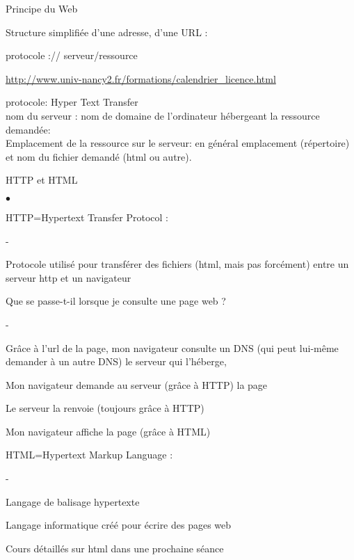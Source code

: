 \documentclass[hyperref=dvips,11pt,svgnames, smaller,  aspectratio=169]{beamer}
\begin{document}
\begin{frame}
	\begin{block}{Principe du Web}

Structure simplifiée d’une adresse, d’une URL :

protocole :// serveur/ressource


\url{http://www.univ-nancy2.fr/formations/calendrier_licence.html}

protocole: Hyper Text Transfer\\
nom du serveur : nom de domaine de l'ordinateur hébergeant la ressource demandée:  \\
Emplacement de la ressource sur le serveur:  en général emplacement (répertoire) et nom du fichier demandé (html ou autre).
	\end{block}
\end{frame}




\begin{frame}
	\begin{block}{HTTP et HTML}

\begin{list}{$\bullet$}{}
\item HTTP=Hypertext Transfer Protocol :
	\begin{list}{-}{}
	\item Protocole utilisé pour transférer des fichiers (html, mais pas forcément) entre un serveur http et un navigateur
	\end{list}
\item Que se passe-t-il lorsque je consulte une page web ?
	\begin{list}{-}{}
	\item Grâce à l’url de la page, mon navigateur consulte un DNS (qui peut lui-même demander à un autre DNS) le serveur qui l’héberge,
	\item Mon navigateur demande au serveur (grâce à HTTP) la page 
	\item Le serveur la renvoie (toujours grâce à HTTP)
	\item Mon navigateur affiche la page (grâce à HTML)
	\end{list}
\item HTML=Hypertext Markup Language :
	\begin{list}{-}{}
	\item Langage de balisage hypertexte
	\item Langage informatique créé pour écrire des pages web
	\item Cours détaillés sur html dans une prochaine séance
	\end{list}
\end{list}
	\end{block}
\end{frame}
\end{document}
